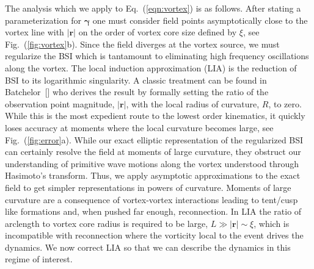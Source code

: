 \documentclass[aps,graphicx,reprint,onecolumn,12pt,tightenlines,longbibliography]{revtex4-1}
\newcommand{\sas}[2]{{#2}}
\begin{document}
\sas{}{The analysis which we apply to Eq.~(\ref{eqn:vortex}) is as follows.} 
After stating a parameterization for $\bm{\gamma}$ one must consider field points asymptotically close to the vortex line with $|\textbf{r}|$ on the order of vortex core size defined by $\xi$, see Fig.~(\ref{fig:vortex}b). \sas{}{Since the field diverges at the vortex source,  we must regularize the BSI which is tantamount to eliminating high frequency oscillations along the vortex.} The local induction approximation (LIA) is the reduction of BSI to its logarithmic singularity. A classic treatment can be found in Batchelor~[] who derives the result by formally setting the ratio of the observation point \sas{}{magnitude}, $|\textbf{r}|$, with the local radius of curvature, $R$, to zero. While this is the most expedient route to the lowest order kinematics, it quickly loses accuracy at moments where the local curvature becomes large, see Fig.~(\ref{fig:error}a). \sas{}{While our exact elliptic representation of the regularized BSI can certainly resolve the field at moments of large curvature, they obstruct our understanding of primitive  wave motions along the vortex understood through Hasimoto's transform. Thus, we apply asymptotic approximations to the exact field to get simpler representations in powers of curvature.} \sas{Such events}{Moments of large curvature} are a \sas{natural}{} consequence of vortex-vortex interactions leading to tent/cusp like formations and, when pushed far enough, reconnection. In LIA the ratio of arclength to vortex core radius is required to be large, $L\gg |\textbf{r}|\sim \xi$, which is incompatible with reconnection where the vorticity local to the event drives the dynamics. \sas{}{We now correct LIA so that we can describe the dynamics in this regime of interest.}
\end{document}
